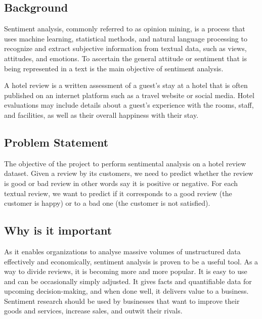 \subsection{Background}
Sentiment analysis, commonly referred to as opinion mining, is a process that uses machine learning, statistical methods, and natural language processing to recognize and extract subjective information from textual data, such as views, attitudes, and emotions. To ascertain the general attitude or sentiment that is being represented in a text is the main objective of sentiment analysis.

A hotel review is a written assessment of a guest's stay at a hotel that is often published on an internet platform such as a travel website or social media. Hotel evaluations may include details about a guest's experience with the rooms, staff, and facilities, as well as their overall happiness with their stay.
\subsection{ Problem Statement}
The objective of the project to perform sentimental analysis on a hotel review dataset. Given a review by its customers, we need to predict whether the review is good or bad review in other words say it is positive or negative.
For each textual review, we want to predict if it corresponds to a good review (the customer is happy) or to a bad one (the customer is not satisfied).
\subsection{Why is it important}
As it enables organizations to analyse massive volumes of unstructured data effectively and economically, sentiment analysis is proven to be a useful tool. As a way to divide reviews, it is becoming more and more popular. It is easy to use and can be occasionally simply adjusted. It gives facts and quantifiable data for upcoming decision-making, and when done well, it delivers value to a business. Sentiment research should be used by businesses that want to improve their goods and services, increase sales, and outwit their rivals.

